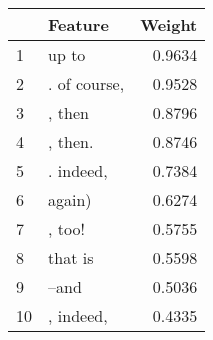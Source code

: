 \begin{tabular}{llr}
\toprule
{} &       Feature &  Weight \\
\midrule
1  &         up to &  0.9634 \\
2  &  . of course, &  0.9528 \\
3  &        , then &  0.8796 \\
4  &       , then. &  0.8746 \\
5  &     . indeed, &  0.7384 \\
6  &        again) &  0.6274 \\
7  &        , too! &  0.5755 \\
8  &       that is &  0.5598 \\
9  &         --and &  0.5036 \\
10 &     , indeed, &  0.4335 \\
\bottomrule
\end{tabular}
